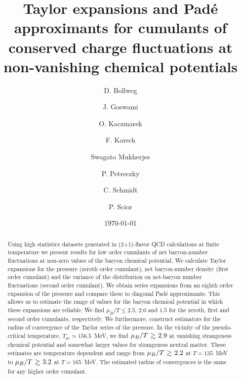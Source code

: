 \documentclass[pdflatex,prd,twocolumn,showpacs,superscriptaddress,nofootinbib]{revtex4-1}
\def\gsim{\raise0.3ex\hbox{$>$\kern-0.75em\raise-1.1ex\hbox{$\sim$}}}
\begin{document}

\title{Taylor expansions and Pad\'e approximants
for cumulants of conserved charge fluctuations 
at non-vanishing chemical potentials}

\author{D. Bollweg}
\author{J. Goswami}
\author{O. Kaczmarek}
\author{F. Karsch}
\author{Swagato Mukherjee}
\author{P. Petreczky}
\author{C. Schmidt}
\author{P. Scior}

\date{\today}


\begin{abstract}
Using high statistics datasets generated in (2+1)-flavor QCD calculations at finite temperature we present results for low order cumulants of net
baryon-number fluctuations at 
non-zero values of the baryon chemical potential.
We calculate Taylor expansions for the pressure
(zeroth order cumulant), net baryon-number density (first order cumulant) and the variance of the distribution on net-baryon number
fluctuations (second order cumulant). We obtain series expansions from an eighth order expansion of the pressure
and compare these to diagonal Pad\'e approximants.
This allows us to estimate the range of values for the baryon chemical potential in which these 
expansions are reliable. We find $\mu_B/T\le 2.5$, $2.0$ and $1.5$ for the zeroth, first
and second order cumulants, respectively. We furthermore, construct estimators for
the radius of convergence of the Taylor series of the pressure. In the vicinity of the pseudo-critical temperature, $T_{pc}\simeq 156.5$~MeV, we find $\mu_B/T\ \gsim\ 2.9$ at vanishing strangeness chemical potential and somewhat larger values for strangeness neutral matter. These estimates are temperature dependent and range from $\mu_B/T\ \gsim\ 2.2$ at $T=135$~MeV to 
$\mu_B/T\ \gsim\ 3.2$ at $T=165$~MeV. The estimated radius of convergences is the same for any higher order cumulant.

\end{abstract}
\end{document}
